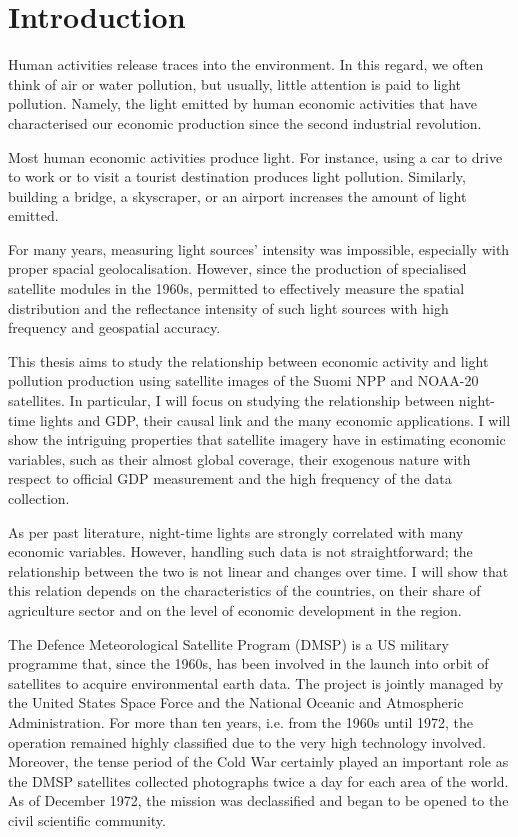 \chapter{Introduction}\label{ch:introduction}
Human activities release traces into the environment. In this regard, we often think of air or water pollution, but usually, little attention is paid to light pollution. Namely, the light emitted by human economic activities that have characterised our economic production since the second industrial revolution.

Most human economic activities produce light. For instance, using a car to drive to work or to visit a tourist destination produces light pollution. Similarly, building a bridge, a skyscraper, or an airport increases the amount of light emitted.

For many years, measuring light sources' intensity was impossible, especially with proper spacial geolocalisation. However, since the production of specialised satellite modules in the 1960s, permitted to effectively measure the spatial distribution and the reflectance intensity of such light sources with high frequency and geospatial accuracy.

This thesis aims to study the relationship between economic activity and light pollution production using satellite images of the Suomi NPP and NOAA-20 satellites. In particular, I will focus on studying the relationship between night-time lights and GDP, their causal link and the many economic applications. I will show the intriguing properties that satellite imagery have in estimating economic variables, such as their almost global coverage, their exogenous nature with respect to official GDP measurement and the high frequency of the data collection.

As per past literature, night-time lights are strongly correlated with many economic variables. However, handling such data is not straightforward; the relationship between the two is not linear and changes over time. I will show that this relation depends on the characteristics of the countries, on their share of agriculture sector and on the level of economic development in the region.

The Defence Meteorological Satellite Program (DMSP) is a US military programme that, since the 1960s, has been involved in the launch into orbit of satellites to acquire environmental earth data. The project is jointly managed by the United States Space Force and the National Oceanic and Atmospheric Administration.
For more than ten years, i.e. from the 1960s until 1972, the operation remained highly classified due to the very high technology involved. Moreover, the tense period of the Cold War certainly played an important role as the DMSP satellites collected photographs twice a day for each area of the world.
As of December 1972, the mission was declassified and began to be opened to the civil scientific community.

